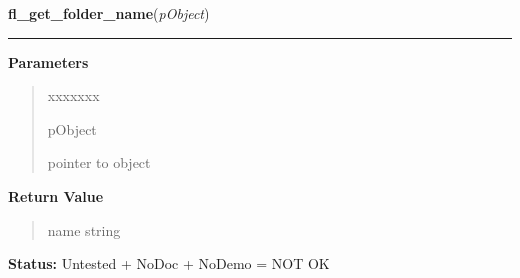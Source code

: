 \hspace{.8\funcindent}\begin{boxedminipage}{\funcwidth}

    \raggedright \textbf{fl\_get\_folder\_name}(\textit{pObject})

    \vspace{-1.5ex}

    \rule{\textwidth}{0.5\fboxrule}
\setlength{\parskip}{2ex}
\setlength{\parskip}{1ex}
      \textbf{Parameters}
      \vspace{-1ex}

      \begin{quote}
        \begin{Ventry}{xxxxxxx}

          \item[pObject]

          pointer to object

        \end{Ventry}

      \end{quote}

      \textbf{Return Value}
    \vspace{-1ex}

      \begin{quote}
      name string

      \end{quote}

\textbf{Status:} Untested + NoDoc + NoDemo = NOT OK



    \end{boxedminipage}

    \label{xformslib:library:fl_get_tabfolder_numfolders}

    \vspace{0.5ex}


